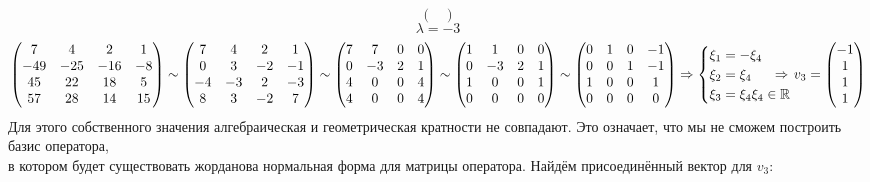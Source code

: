\documentclass{article}
\newcommand{\la}{\lambda}
\newcommand{\shiftleft}[3]{\makebox[#1][r]{\makebox[#2][l]{#3}}}
\begin{document}
\begin{center}
$$\begin{pmatrix}
\end{pmatrix}$$
$$\la = -3$$
$$\begin{pmatrix}
7 & 4 & 2 & 1 \\
-49 & -25 & -16 & -8 \\
45 & 22 & 18 & 5 \\
57 & 28 & 14 & 15 \\
\end{pmatrix} \sim \begin{pmatrix}
7 & 4 & 2 & 1 \\
0 & 3 & -2 & -1 \\
-4 & -3 & 2 & -3 \\
8 & 3 & -2 & 7 \\
\end{pmatrix} \sim \begin{pmatrix}
7 & 7 & 0 & 0 \\
0 & -3 & 2 & 1 \\
4 & 0 & 0 & 4 \\
4 & 0 & 0 & 4 \\
\end{pmatrix} \sim \begin{pmatrix}
1 & 1 & 0 & 0 \\
0 & -3 & 2 & 1 \\
1 & 0 & 0 & 1 \\
0 & 0 & 0 & 0 \\
\end{pmatrix} \sim \begin{pmatrix}
0 & 1 & 0 & -1 \\
0 & 0 & 1 & -1 \\
1 & 0 & 0 & 1 \\
0 & 0 & 0 & 0 \\
\end{pmatrix} \Rightarrow \begin{cases}
\xi_1 = -\xi_4 \\
\xi_2 = \xi_4 \\
\xi_3 = \xi_4
\xi_4 \in \mathbb{R}
\end{cases}  \shiftleft{-10pt}{14pt}{$\Rightarrow$} v_3=\begin{pmatrix}
-1 \\ 1 \\ 1 \\ 1
\end{pmatrix}$$
Для этого собственного значения алгебраическая и геометрическая кратности не совпадают. Это означает, что мы не сможем построить базис оператора, \\в котором будет существовать жорданова нормальная форма для матрицы оператора. Найдём присоединённый вектор для $v_3$:

\end{center}
\end{document}
